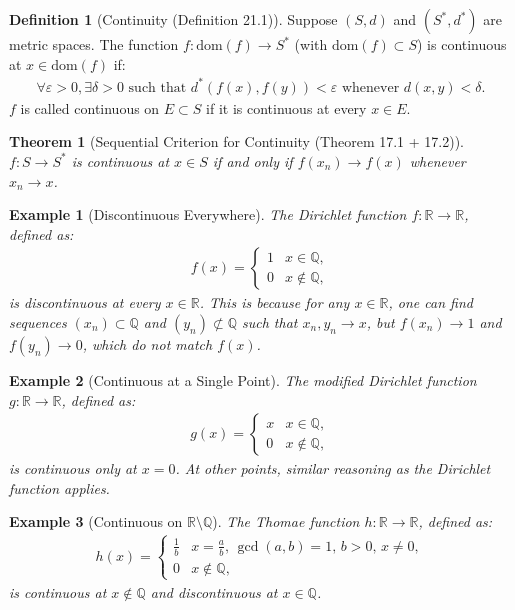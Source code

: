 \documentclass[7pt]{article}
\theoremstyle{definition}
\newtheorem{definition}{Definition}
\theoremstyle{plain}
\newtheorem{theorem}{Theorem}
\newtheorem{example}{Example}
\begin{document}
\begin{definition}[Continuity (Definition 21.1)]
Suppose $ (S, d) $ and $ (S^*, d^*) $ are metric spaces. The function $ f : \text{dom}(f) \to S^* $ (with $ \text{dom}(f) \subset S $) is continuous at $ x \in \text{dom}(f) $ if:
\begin{align}
\forall \varepsilon > 0, \exists \delta > 0 \text{ such that } d^*(f(x), f(y)) < \varepsilon \text{ whenever } d(x, y) < \delta.
\end{align}
$ f $ is called continuous on $ E \subset S $ if it is continuous at every $ x \in E $.
\end{definition}

\begin{theorem}[Sequential Criterion for Continuity (Theorem 17.1 + 17.2)]
$ f : S \to S^* $ is continuous at $ x \in S $ if and only if $ f(x_n) \to f(x) $ whenever $ x_n \to x $.
\end{theorem}

\begin{example}[Discontinuous Everywhere]
The Dirichlet function $ f : \mathbb{R} \to \mathbb{R} $, defined as:
\begin{align}
f(x) =
\begin{cases}
1 & x \in \mathbb{Q}, \\
0 & x \notin \mathbb{Q},
\end{cases}
\end{align}
is discontinuous at every $ x \in \mathbb{R} $. This is because for any $ x \in \mathbb{R} $, one can find sequences $ (x_n) \subset \mathbb{Q} $ and $ (y_n) \not\subset \mathbb{Q} $ such that $ x_n, y_n \to x $, but $ f(x_n) \to 1 $ and $ f(y_n) \to 0 $, which do not match $ f(x) $.
\end{example}

\begin{example}[Continuous at a Single Point]
The modified Dirichlet function $ g : \mathbb{R} \to \mathbb{R} $, defined as:
\begin{align}
g(x) =
\begin{cases}
x & x \in \mathbb{Q}, \\
0 & x \notin \mathbb{Q},
\end{cases}
\end{align}
is continuous only at $ x = 0 $. At other points, similar reasoning as the Dirichlet function applies.
\end{example}

\begin{example}[Continuous on $ \mathbb{R} \setminus \mathbb{Q} $]
The Thomae function $ h : \mathbb{R} \to \mathbb{R} $, defined as:
\begin{align}
h(x) =
\begin{cases}
\frac{1}{b} & x = \frac{a}{b}, \, \gcd(a, b) = 1, \, b > 0, \, x \neq 0, \\
0 & x \notin \mathbb{Q},
\end{cases}
\end{align}
is continuous at $ x \notin \mathbb{Q} $ and discontinuous at $ x \in \mathbb{Q} $.
\end{example}
\end{document}
